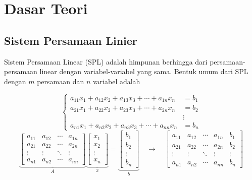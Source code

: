 \documentclass{article}
\begin{document}
\section{Dasar Teori}
\subsection{Sistem Persamaan Linier}

Sistem Persamaan Linear (SPL) adalah himpunan berhingga dari persamaan-persamaan linear dengan
variabel-variabel yang sama. Bentuk umum dari SPL dengan $m$ persamaan dan $n$ variabel adalah

\[
\left\{
\begin{aligned}
a_{11}x_1 + a_{12}x_2 + a_{13}x_3 + \cdots + a_{1n}x_n &= b_1 \\
a_{21}x_1 + a_{22}x_2 + a_{23}x_3 + \cdots + a_{2n}x_n &= b_2 \\
&\vdots \\
a_{n1}x_1 + a_{n2}x_2 + a_{n3}x_3 + \cdots + a_{nn}x_n &= b_n
\end{aligned}
\right.
\]
\[
\underbrace{
\begin{bmatrix}
a_{11} & a_{12} & \cdots & a_{1n} \\
a_{21} & a_{22} & \cdots & a_{2n} \\
\vdots & \vdots & \ddots & \vdots \\
a_{n1} & a_{n2} & \cdots & a_{nn}
\end{bmatrix}
}_{A}
\underbrace{
\begin{bmatrix}
x_1 \\
x_2 \\
\vdots \\
x_n
\end{bmatrix}
}_{x}
=
\underbrace{
\begin{bmatrix}
b_1 \\
b_2 \\
\vdots \\
b_n
\end{bmatrix}
}_{b}
\quad \longrightarrow \quad
\begin{bmatrix}
a_{11} & a_{12} & \cdots & a_{1n} & b_1 \\
a_{21} & a_{22} & \cdots & a_{2n} & b_2 \\
\vdots & \vdots & \ddots & \vdots & \vdots \\
a_{n1} & a_{n2} & \cdots & a_{nn} & b_n
\end{bmatrix}
\]
\end{document}
